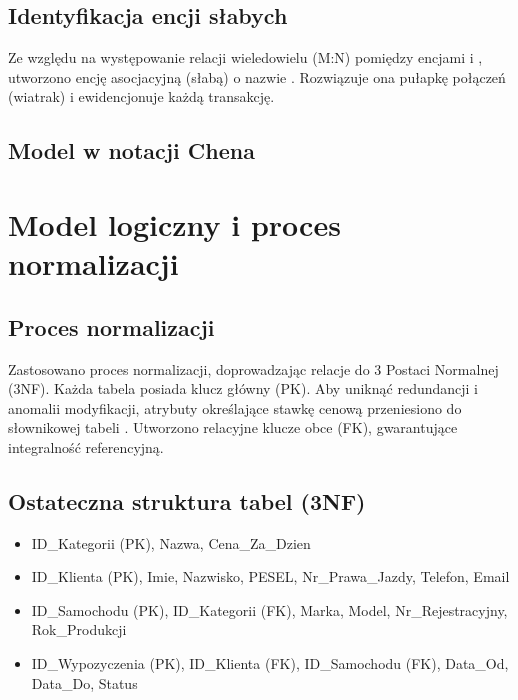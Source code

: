 \documentclass[a4paper,11pt,english,openany,oneside]{sphinxmanual}
\begin{document}
\subsection{Identyfikacja encji słabych}
\label{\detokenize{rozdzial_3/index:identyfikacja-encji-slabych}}
\sphinxAtStartPar
Ze względu na występowanie relacji wiele\sphinxhyphen{}do\sphinxhyphen{}wielu (M:N) pomiędzy encjami  i , utworzono encję asocjacyjną (słabą) o nazwie . Rozwiązuje ona pułapkę połączeń (wiatrak) i ewidencjonuje każdą transakcję.


\subsection{Model w notacji Chena}
\label{\detokenize{rozdzial_3/index:model-w-notacji-chena}}

\section{Model logiczny i proces normalizacji}
\label{\detokenize{rozdzial_3/index:model-logiczny-i-proces-normalizacji}}

\subsection{Proces normalizacji}
\label{\detokenize{rozdzial_3/index:proces-normalizacji}}
\sphinxAtStartPar
Zastosowano proces normalizacji, doprowadzając relacje do 3 Postaci Normalnej (3NF). Każda tabela posiada klucz główny (PK). Aby uniknąć redundancji i anomalii modyfikacji, atrybuty określające stawkę cenową przeniesiono do słownikowej tabeli . Utworzono relacyjne klucze obce (FK), gwarantujące integralność referencyjną.


\subsection{Ostateczna struktura tabel (3NF)}
\label{\detokenize{rozdzial_3/index:ostateczna-struktura-tabel-3nf}}\begin{itemize}
\item {} 
\sphinxAtStartPar
{} ID\_Kategorii (PK), Nazwa, Cena\_Za\_Dzien

\item {} 
\sphinxAtStartPar
{} ID\_Klienta (PK), Imie, Nazwisko, PESEL, Nr\_Prawa\_Jazdy, Telefon, Email

\item {} 
\sphinxAtStartPar
{} ID\_Samochodu (PK), ID\_Kategorii (FK), Marka, Model, Nr\_Rejestracyjny, Rok\_Produkcji

\item {} 
\sphinxAtStartPar
{} ID\_Wypozyczenia (PK), ID\_Klienta (FK), ID\_Samochodu (FK), Data\_Od, Data\_Do, Status

\end{itemize}
\end{document}
